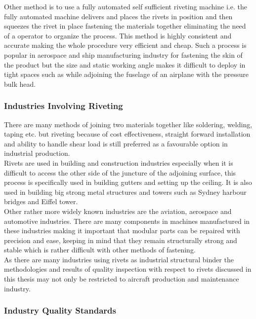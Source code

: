 \documentclass{article}
\begin{document}
Other method is to use a fully automated self sufficient riveting machine i.e. the fully automated machine delivers and places the rivets in position and then squeezes the rivet in place fastening the materials together eliminating the need of a operator to organize the process. This method is highly consistent and accurate making the whole procedure very efficient and cheap. Such a process is popular in aerospace and ship manufacturing industry for fastening the skin of the product but the size and static working angle makes it difficult to deploy in tight spaces such as while adjoining the fuselage of an airplane with the pressure bulk head.

\subsubsection{Industries Involving Riveting}

There are many methods of joining two materials together like soldering, welding, taping etc. but riveting because of cost effectiveness, straight forward installation and ability to handle shear load is still preferred as a favourable option in industrial production. \\

Rivets are used in building and construction industries especially when it is difficult to access the other side of the juncture of the adjoining surface, this process is specifically used in building gutters and setting up the ceiling. It is also used in building big strong metal structures and towers such as Sydney harbour bridges and Eiffel tower. \\

Other rather more widely known industries are the aviation, aerospace and automotive industries. There are many components in machines manufactured in these industries making it important that modular parts can be repaired with precision and ease, keeping in mind that they remain structurally strong and stable which is rather difficult with other methods of fastening.\\

As there are many industries using rivets as industrial structural binder the methodologies and results of quality inspection with respect to rivets discussed in this thesis may not only be restricted to aircraft production and maintenance industry. 

\subsubsection{Industry Quality Standards}
    
\end{document}
